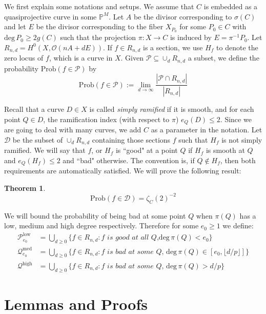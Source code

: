 \documentclass[12pt]{article}
\theoremstyle{plain}
\newtheorem{theorem}[equation]{Theorem}
\theoremstyle{definition}
\newcommand{\IP}{\mathbb{P}}
\newcommand{\sD}{\mathcal{D}}
\newcommand{\sO}{\mathcal{O}}
\newcommand{\sP}{\mathcal{P}}
\newcommand{\sQ}{\mathcal{Q}}
\renewcommand{\deg}{\mathrm{deg}\,}
\newcommand\union{\bigcup}
\newcommand{\<}{\langle}
\renewcommand{\>}{\rangle}
\newcommand{\Prob}{\mathrm{Prob}}
\begin{document}
We first explain some notations and setups. We assume that $C$ is embedded as a quasiprojective curve in some $\IP^M$. Let $A$ be the divisor corresponding to $\sigma(C)$ and let $E$ be the divisor corresponding to the fiber $X_{P_0}$ for some $P_0 \in C$ with $\deg P_0 \ge 2g(C)$ such that the projection $\pi : X \to C$ is induced by $E = \pi^{-1}P_0$. Let $R_{n, d} = H^0(X, \sO(nA + dE))$. If $f \in R_{n, d}$ is a section, we use $H_f$ to denote the zero locus of $f$, which is a curve in $X$. Given $\sP \subseteq \cup_d R_{n, d}$ a subset, we define the probability $\Prob(f \in \sP)$ by 
$$ \Prob(f \in \sP) := \lim_{d \to \infty} \frac{|\sP \cap R_{n, d}|}{|R_{n, d}|} $$

Recall that a curve $D \in X$ is called \textit{simply ramified} if it is smooth, and for each point $Q \in D$, the ramification index (with respect to $\pi$) $e_Q(D) \le 2$. Since we are going to deal with many curves, we add $C$ as a parameter in the notation. Let $\sD$ be the subset of $\cup_d R_{n, d}$ containing those sections $f$ such that $H_f$ is not simply ramified. We will say that $f$, or $H_f$ is ``good" at a point $Q$ if $H_f$ is smooth at $Q$ and $e_Q(H_f) \le 2$ and ``bad" otherwise. The convention is, if $Q \not\in H_f$, then both requirements are automatically satisfied. 
We will prove the following result: 

\begin{theorem}
$$ \Prob( f \in \sD) = \zeta_C(2)^{-2} $$
\end{theorem}
We will bound the probability of being bad at some point $Q$ when $\pi(Q)$ has a low, medium and high degree respectively. Therefore for some $e_0 \ge 1$ we define: 
\begin{align*}
\sP_{e_0}^{\mathrm{low}} &= \union_{d \ge 0} \{ f \in R_{n, d} : f \textit{ is good at all $Q$,}\deg \pi(Q) < e_0\}\\
\sQ_{e_0}^{\mathrm{med}} &= \union_{d \ge 0} \{f \in R_{n, d} : f \textit{ is bad at some $Q$, }\deg \pi(Q) \in [e_0, \lfloor d/p \rfloor]\}\\
\sQ^{\mathrm{high}} &= \union_{d \ge 0} \{f \in R_{n, d} : f \textit{ is bad at some $Q$, }\deg \pi(Q) > d/p\}
\end{align*}

\section{Lemmas and Proofs}
\end{document}
